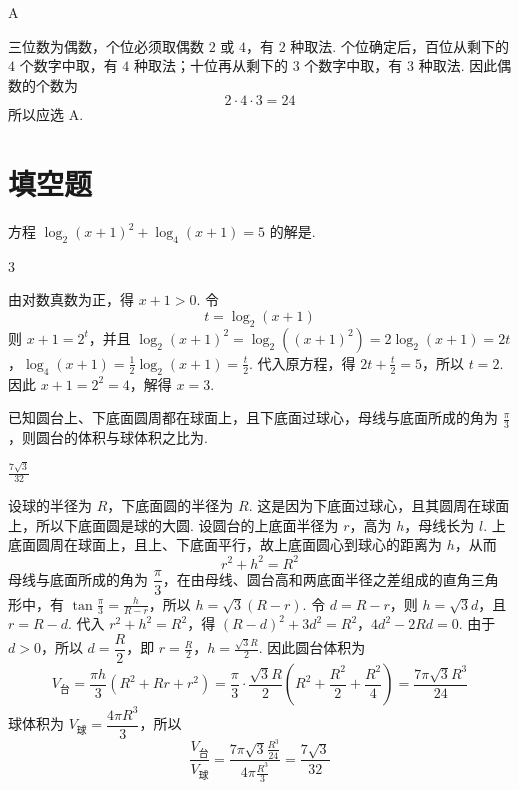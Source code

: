 \begin{answer}
A
\end{answer}

\begin{solution}
三位数为偶数，个位必须取偶数 \(2\) 或 \(4\)，有 \(2\) 种取法. 个位确定后，百位从剩下的 \(4\) 个数字中取，有 \(4\) 种取法；十位再从剩下的 \(3\) 个数字中取，有 \(3\) 种取法. 因此偶数的个数为
\[
2\cdot4\cdot3=24
\]
所以应选 A.
\end{solution}

\section{填空题}

\begin{problem}
方程 \(\log_2(x + 1)^2 + \log_4(x + 1) = 5\) 的解是\fillinblank{}.
\end{problem}

\begin{answer}
\(3\)
\end{answer}

\begin{solution}
由对数真数为正，得 \(x+1>0\). 令
\[
t=\log_2(x+1)
\]
则 \(x+1=2^t\)，并且 \(\log_2(x+1)^2=\log_2\left((x+1)^2\right)=2\log_2(x+1)=2t\)，\(\log_4(x+1)=\frac12\log_2(x+1)=\frac t2\).
代入原方程，得 \(2t+\frac t2=5\)，所以 \(t=2\).
因此 \(x+1=2^2=4\)，解得 \(x=3\).
\end{solution}

\begin{problem}
已知圆台上、下底面圆周都在球面上，且下底面过球心，母线与底面所成的角为 \(\frac{\pi}{3}\)，则圆台的体积与球体积之比为\fillinblank{}.
\end{problem}

\begin{answer}
\(\frac{7\sqrt{3}}{32}\)
\end{answer}

\begin{solution}
设球的半径为 \(R\)，下底面圆的半径为 \(R\). 这是因为下底面过球心，且其圆周在球面上，所以下底面圆是球的大圆. 设圆台的上底面半径为 \(r\)，高为 \(h\)，母线长为 \(l\). 上底面圆周在球面上，且上、下底面平行，故上底面圆心到球心的距离为 \(h\)，从而
\[
r^2+h^2=R^2
\]
母线与底面所成的角为 \(\dfrac{\pi}{3}\)，在由母线、圆台高和两底面半径之差组成的直角三角形中，有 \(\tan\frac{\pi}{3}=\frac{h}{R-r}\)，所以 \(h=\sqrt3(R-r)\).
令 \(d=R-r\)，则 \(h=\sqrt3d\)，且 \(r=R-d\). 代入 \(r^2+h^2=R^2\)，得
\((R-d)^2+3d^2=R^2\)，\(4d^2-2Rd=0\).
由于 \(d>0\)，所以 \(d=\dfrac R2\)，即 \(r=\frac R2\)，\(h=\frac{\sqrt3 R}{2}\).
因此圆台体积为
\[
V_{\text{台}}=\frac{\pi h}{3}\left(R^2+Rr+r^2\right)
=\frac{\pi}{3}\cdot\frac{\sqrt3 R}{2}
\left(R^2+\frac{R^2}{2}+\frac{R^2}{4}\right)
=\frac{7\pi\sqrt3 R^3}{24}
\]
球体积为 \(V_{\text{球}}=\dfrac{4\pi R^3}{3}\)，所以
\[
\frac{V_{\text{台}}}{V_{\text{球}}}
=\frac{7\pi\sqrt3 \frac{R^3}{24}}{4\pi \frac{R^3}{3}}
=\frac{7\sqrt3}{32}
\]
\end{solution}

